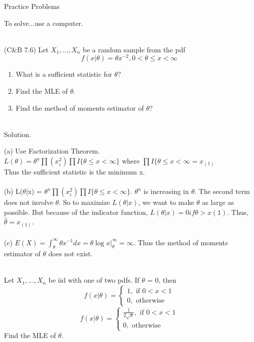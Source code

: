 \documentclass[11pt,fleqn]{book} %
\begin{document}
\begin{section}{Practice Problems}
\begin{problem}
			To solve...use a computer.\\
			\\

	\end{problem}
	
	\begin{problem} (C\&B 7.6) Let $X_1, \dots, X_n$ be a random sample from the pdf
	$$f(x|\theta) = \theta x^{-2}, 0<\theta\le x < \infty $$

	\begin{enumerate}[label=(\alph*)]
		\item What is a sufficient statistic for $\theta$?
		\item Find the MLE of $\theta$.
		\item Find the method of moments estimator of $\theta$?\\
		\\
	\end{enumerate}
		

		Solution. 

		(a) Use Factorization Theorem.\\ 
		$L(\theta) = \theta^n \prod(x_i^2) \prod I\{\theta \le x < \infty\}$ where $\prod I\{\theta \le x < \infty = x_{(1)}$\\
		Thus the sufficient statistic is the minimum x. \\
		\\
		(b) L($\theta$|x) = $\theta^n \prod(x_i^2) \prod I\{\theta \le x < \infty \}$. $\theta^n$ is increasing in $\theta$. The second term does not involve $\theta$. So to maximize $L(\theta|x)$, we want to make $\theta$ as large as possible. But because of the indicator function, $L(\theta|x) = 0 if \theta > x(1)$. Thus, $\hat{\theta} = x_{(1)}$.\\
		\\
		(c) $E(X) = \int^\infty_\theta \theta x^{-1} dx = \theta \log x|^\infty_\theta = \infty$. Thus the method of moments estimator of $\theta$ does not exist.\\
		\\

	\end{problem}

	\begin{problem} Let $X_1, \dots, X_n$ be iid with one of two pdfs. If $\theta$ = 0, then
	$$ f(x|\theta) = \begin{cases} 1,\text{ if } 0<x<1 \\ 0, \text{ otherwise} \end{cases}$$
	$$ f(x|\theta) = \begin{cases} \frac{1}{2\sqrt{x}},\text{ if } 0<x<1 \\ 0, \text{ otherwise} \end{cases}$$
	Find the MLE of $\theta$.\\
	\\


\end{problem}
\end{section}
\end{document}
